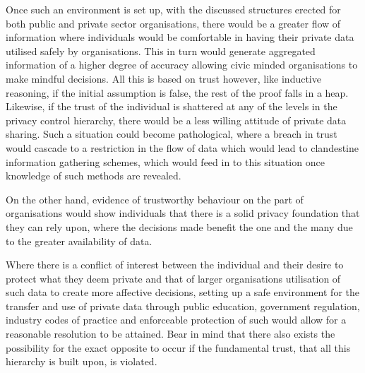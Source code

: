 Once such an environment is set up, with the discussed structures erected for
both public and private sector organisations, there would be a greater flow of
information where individuals would be comfortable in having their private data
utilised safely by organisations. This in turn would generate aggregated
information of a higher degree of accuracy allowing civic minded organisations
to make mindful decisions. All this is based on trust however, like inductive
reasoning, if the initial assumption is false, the rest of the proof falls in
a heap. Likewise, if the trust of the individual is shattered at any of the
levels in the privacy control hierarchy, there would be a less willing attitude
of private data sharing. Such a situation could become pathological, where a
breach in trust would cascade to a restriction in the flow of data which would
lead to clandestine information gathering schemes, which would feed in to this
situation once knowledge of such methods are revealed.

On the other hand, evidence of trustworthy behaviour on the part of
organisations would show individuals that there is a solid privacy foundation
that they can rely upon, where the decisions made benefit the one and the many
due to the greater availability of data.

Where there is a conflict of interest between the individual and their desire
to protect what they deem private and that of larger organisations utilisation
of such data to create more affective decisions, setting up a safe environment
for the transfer and use of private data through public education, government
regulation, industry codes of practice and enforceable protection of such would
allow for a reasonable resolution to be attained. Bear in mind that there
also exists the possibility for the exact opposite to occur if the fundamental
trust, that all this hierarchy is built upon, is violated. 


\nocite{*}   %

\bye
